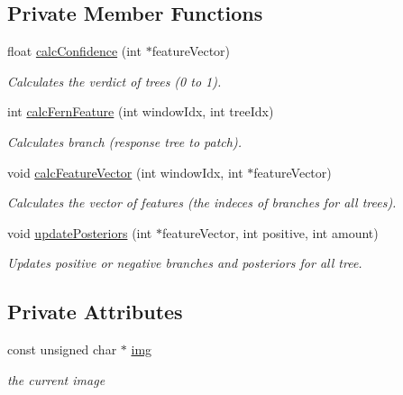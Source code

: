 \subsection*{Private Member Functions}
\begin{DoxyCompactItemize}
\item 
float \hyperlink{classtld_1_1EnsembleClassifier_a61bfb5ac45a8ab7f3c36c9c30dc7f927}{calc\-Confidence} (int $\ast$feature\-Vector)
\begin{DoxyCompactList}\small\item\em Calculates the verdict of trees (0 to 1). \end{DoxyCompactList}\item 
int \hyperlink{classtld_1_1EnsembleClassifier_aae503fd99be0b876d9a5ca75460c2f27}{calc\-Fern\-Feature} (int window\-Idx, int tree\-Idx)
\begin{DoxyCompactList}\small\item\em Calculates branch (response tree to patch). \end{DoxyCompactList}\item 
void \hyperlink{classtld_1_1EnsembleClassifier_abb535a84ebd8b15aa401a11d94e0a641}{calc\-Feature\-Vector} (int window\-Idx, int $\ast$feature\-Vector)
\begin{DoxyCompactList}\small\item\em Calculates the vector of features (the indeces of branches for all trees). \end{DoxyCompactList}\item 
void \hyperlink{classtld_1_1EnsembleClassifier_a0d7853e4cee2e0220c218f43ae78b5a9}{update\-Posteriors} (int $\ast$feature\-Vector, int positive, int amount)
\begin{DoxyCompactList}\small\item\em Updates positive or negative branches and posteriors for all tree. \end{DoxyCompactList}\end{DoxyCompactItemize}
\subsection*{Private Attributes}
\begin{DoxyCompactItemize}
\item 
const unsigned char $\ast$ \hyperlink{classtld_1_1EnsembleClassifier_a0894da7012fdd72a562dbf78f719bfe9}{img}
\begin{DoxyCompactList}\small\item\em the current image \end{DoxyCompactList}\end{DoxyCompactItemize}


